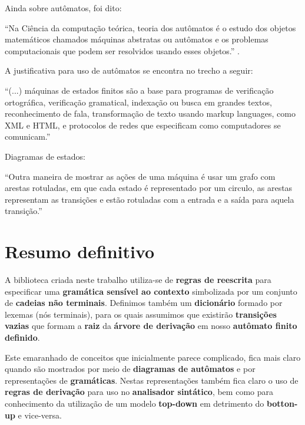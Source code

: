 \documentclass[12pt,a4paper,oneside,english,brazilian,brazil]{abntex2}
\begin{document}
Ainda sobre autômatos, foi dito:

\begin{citacao} ``Na Ciência da computação teórica, teoria dos autômatos é o estudo dos objetos matemáticos chamados máquinas abstratas ou autômatos e os problemas computacionais que podem ser resolvidos usando esses objetos.'' \cite{wiki:automatos}. 
\end{citacao}

\par A justificativa para uso de autômatos se encontra no trecho a seguir:

\begin{citacao}
``(...) máquinas de estados finitos são a base para programas de verificação ortográfica, verificação gramatical, indexação ou busca em grandes textos, reconhecimento de fala, transformação de texto usando markup languages, como XML e HTML, e protocolos de redes que especificam como computadores se comunicam.'' \cite{matdiscreta1}
\end{citacao}

\par Diagramas de estados:

\begin{citacao}
``Outra maneira de mostrar as ações de uma máquina é usar um grafo com arestas rotuladas, em que cada estado é representado por um circulo, as arestas representam as transições e estão rotuladas com a entrada e a saída para aquela transição.'' \cite{matdiscreta1}
\end{citacao}

\section{Resumo definitivo}

A biblioteca criada neste trabalho utiliza-se de \textbf{regras de reescrita} para especificar uma \textbf{gramática sensível ao contexto} simbolizada por um conjunto de \textbf{cadeias não terminais}. Definimos também um \textbf{dicionário} formado por lexemas (nós terminais), para os quais assumimos que existirão \textbf{transições vazias} que formam a \textbf{raiz} da \textbf{árvore de derivação} em nosso \textbf{autômato finito definido}.

Este emaranhado de conceitos que inicialmente parece complicado, fica mais claro quando são mostrados por meio de \textbf{diagramas de autômatos} e por representações de \textbf{gramáticas}. Nestas representações também fica claro o uso de \textbf{regras de derivação} para uso no \textbf{analisador sintático}, bem como para conhecimento da utilização de um modelo \textbf{top-down} em detrimento do \textbf{botton-up} e vice-versa.
\end{document}
